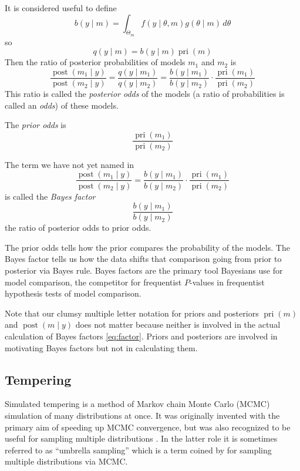 \documentclass[11pt]{article}
\DeclareMathOperator{\prior}{pri}
\DeclareMathOperator{\posterior}{post}
\begin{document}
It is considered useful to define
$$
   b(y \mid m)
   =
   \int_{\Theta_m} f(y \mid \theta, m) g(\theta \mid m) \, d \theta
$$
so
$$
   q(y \mid m) = b(y \mid m) \prior(m)
$$
Then the ratio of posterior probabilities of models $m_1$ and $m_2$ is
$$
   \frac{\posterior(m_1 \mid y)}{\posterior(m_2 \mid y)}
   =
   \frac{q(y \mid m_1)}{q(y \mid m_2)}
   =
   \frac{b(y \mid m_1)}{b(y \mid m_2)}
   \cdot
   \frac{\prior(m_1)}{\prior(m_2)}
$$
This ratio is called the \emph{posterior odds} of the models (a ratio of
probabilities is called an \emph{odds}) of these models.

The \emph{prior odds} is
$$
   \frac{\prior(m_1)}{\prior(m_2)}
$$

The term we have not yet named in
$$
   \frac{\posterior(m_1 \mid y)}{\posterior(m_2 \mid y)}
   =
   \frac{b(y \mid m_1)}{b(y \mid m_2)}
   \cdot
   \frac{\prior(m_1)}{\prior(m_2)}
$$
is called the \emph{Bayes factor}
\begin{equation} \label{eq:factor}
   \frac{b(y \mid m_1)}{b(y \mid m_2)}
\end{equation}
the ratio of posterior odds to prior odds.

The prior odds tells how the prior compares the probability of the models.
The Bayes factor tells us how the data shifts that comparison going from
prior to posterior via Bayes rule.
Bayes factors are the primary tool Bayesians use for model comparison,
the competitor for frequentist $P$-values in frequentist hypothesis
tests of model comparison.

Note that our clumsy multiple letter notation for priors and posteriors
$\prior(m)$ and $\posterior(m \mid y)$ does not matter because neither
is involved in the actual calculation of Bayes factors \eqref{eq:factor}.
Priors and posteriors are involved in motivating Bayes factors but not in
calculating them.

\subsection{Tempering} \label{sec:temper}

Simulated tempering \citep{marinari-parisi,geyer-thompson} is a method of
Markov chain Monte Carlo (MCMC) simulation of many distributions at once.
It was originally invented with the primary aim of speeding up MCMC
convergence, but was also recognized to be useful for sampling multiple
distributions \citep{geyer-thompson}.  In the latter role it is sometimes
referred to as ``umbrella sampling'' which is a term coined
by \citet{torrie-valleau} for sampling multiple distributions via MCMC.
\end{document}
